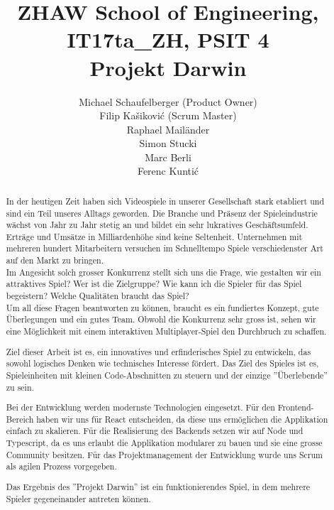 \documentclass[11pt,a4paper,titlepage]{article}
\author{
Michael Schaufelberger (Product Owner)\\
Filip Kašiković (Scrum Master)\\
Raphael Mailänder\\
Simon Stucki\\
Marc Berli\\
Ferenc Kuntić}
\title{{\small ZHAW School of Engineering, 
IT17ta\_ZH, 
PSIT 4}\\
Projekt Darwin}
\begin{document}
\maketitle

\begin{otherlanguage}{english}
\begin{abstract}

In der heutigen Zeit haben sich Videospiele in unserer Gesellschaft stark etabliert und sind ein Teil unseres Alltags geworden. Die Branche und Präsenz der Spieleindustrie wächst von Jahr zu Jahr stetig an und bildet ein sehr lukratives Geschäftsumfeld. Erträge und Umsätze in Milliardenhöhe sind keine Seltenheit. Unternehmen mit mehreren hundert Mitarbeitern versuchen im Schnelltempo Spiele verschiedenster Art auf den Markt zu bringen. 
\\Im Angesicht solch grosser Konkurrenz stellt sich uns die Frage, wie gestalten wir ein attraktives Spiel? Wer ist die Zielgruppe? Wie kann ich die Spieler für das Spiel begeistern? Welche Qualitäten braucht das Spiel?
\\Um all diese Fragen beantworten zu können, braucht es ein fundiertes Konzept, gute Überlegungen und ein gutes Team. Obwohl die Konkurrenz sehr gross ist, sehen wir eine Möglichkeit mit einem interaktiven Multiplayer-Spiel den Durchbruch zu schaffen.

Ziel dieser Arbeit ist es, ein innovatives und erfinderisches Spiel zu entwickeln, das sowohl logisches Denken wie technisches Interesse fördert. Das Ziel des Spieles ist es, Spieleinheiten mit kleinen Code-Abschnitten zu steuern und der einzige ''Überlebende'' zu sein.

Bei der Entwicklung werden modernste Technologien eingesetzt. Für den Frontend-Bereich haben wir uns für React entscheiden, da diese uns ermöglichen die Applikation einfach zu skalieren. Für die Realisierung des Backends setzen wir auf Node und Typescript, da es uns erlaubt die Applikation modularer zu bauen und sie eine grosse Community besitzen.
Für das Projektmanagement der Entwicklung wurde uns Scrum als agilen Prozess vorgegeben.

Das Ergebnis des ''Projekt Darwin'' ist ein funktionierendes Spiel, in dem mehrere Spieler gegeneinander antreten können.

\end{abstract}
\end{otherlanguage}
\end{document}
